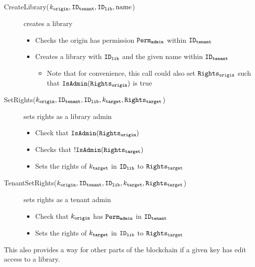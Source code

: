\begin{description}
  \item[CreateLibrary($k_\mathtt{origin}, \mathtt{ID_{tenant}}, \mathtt{ID_{lib}}, \textnormal{name}$)] creates a library
    \begin{itemize}
      \item Checks the origin has permission $\mathtt{Perm_{admin}}$ within $\mathtt{ID_{tenant}}$
      \item Creates a library with $\mathtt{ID_{lib}}$ and the given name within $\mathtt{ID_{tenant}}$
        \begin{itemize}
          \item Note that for convenience, this call could also set $\mathtt{Rights_{origin}}$ such that $\mathtt{IsAdmin}(\mathtt{Rights_{origin}})$ is true
        \end{itemize}
    \end{itemize}
  \item[SetRights($k_\mathtt{origin}, \mathtt{ID_{tenant}}, \mathtt{ID_{lib}}, k_\mathtt{target}, \mathtt{Rights_{target}}$)] sets rights as a library admin
    \begin{itemize}
      \item Check that $\mathtt{IsAdmin}(\mathtt{Rights_{origin}})$ 
      \item Checks that $!\mathtt{IsAdmin}(\mathtt{Rights_{target}})$
      \item Sets the rights of $k_\mathtt{target}$ in $\mathtt{ID_{lib}}$ to $\mathtt{Rights_{target}}$
    \end{itemize}
  \item[TenantSetRights($k_\mathtt{origin}, \mathtt{ID_{tenant}}, \mathtt{ID_{lib}}, k_\mathtt{target}, \mathtt{Rights_{target}}$)] sets rights as a tenant admin
    \begin{itemize}
      \item Check that $k_\mathtt{origin}$ has $\mathtt{Perm_{admin}}$ in $\mathtt{ID_{tenant}}$
      \item Sets the rights of $k_\mathtt{target}$ in $\mathtt{ID_{lib}}$ to $\mathtt{Rights_{target}}$
    \end{itemize}
\end{description}

This also provides a way for other parts of the blockchain if a given key has edit access to a library.
